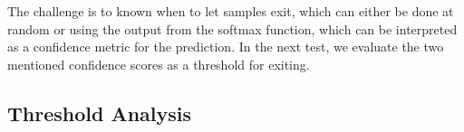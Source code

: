 The challenge is to known when to let samples exit, which can either be done at random or using the output from the softmax function, which can be interpreted as a confidence metric for the prediction. In the next test, we evaluate the two mentioned confidence scores as a threshold for exiting. 


%
%
%


\subsection{Threshold Analysis}

